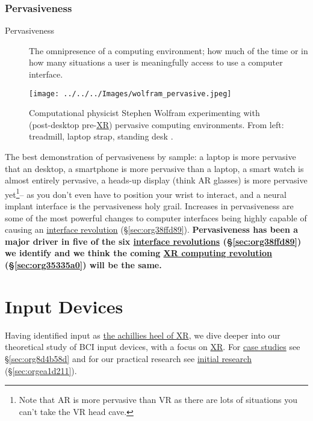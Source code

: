 \documentclass[logo,bsc,singlespacing,parskip]{infthesis}
\begin{document}
\subsection{Pervasiveness}
\label{sec:org7d4794a}
\medskip
\begin{mdframed}
\begin{description}
\item[{Pervasiveness\label{pervasiveness}}] The omnipresence of a computing environment; how much of the time or in how many situations a user is meaningfully access to use a computer interface.
\end{description}
\end{mdframed}

\begin{figure}[H]
\centering
\texttt{[image: ../../../Images/wolfram\_pervasive.jpeg]}
\caption[Stephen Wolfram experimenting with pervasive computing]{Computational physicist Stephen Wolfram experimenting with (post-desktop pre-\hyperref[org53dbe83]{XR}) pervasive computing environments. From left: treadmill, laptop strap, standing desk \autocite{SeekingProductiveLife}.}
\end{figure}

The best demonstration of pervasiveness by sample: a laptop is more pervasive that an desktop, a smartphone is more pervasive than a laptop, a smart watch is almost entirely pervasive, a heads-up display (think AR glasses) is more pervasive yet\footnote{Note that AR is more pervasive than VR as there are lots of situations you can't take the VR head cave.}-- as you don't even have to position your wrist to interact, and a neural implant interface is the pervasiveness holy grail.
Increases in pervasiveness are some of the most powerful changes to computer interfaces being highly capable of causing an \hyperref[sec:org38ffd89]{interface revolution} (\S \ref{sec:org38ffd89}).
\textbf{Pervasiveness has been a major driver in five of the six \hyperref[sec:org38ffd89]{interface revolutions} (\S \ref{sec:org38ffd89}) we identify and we think the coming \hyperref[sec:org35335a0]{XR computing revolution} (\S \ref{sec:org35335a0}) will be the same.}

\chapter{Input Devices}
\label{sec:org833010d}
Having identified input as \hyperref[sec:org5bf0840]{the achillies heel of XR}, we dive deeper into our theoretical study of BCI input devices, with a focus on \hyperref[org53dbe83]{XR}.
For \hyperref[sec:org8d4b58d]{case studies} see \S \ref{sec:org8d4b58d} and for our practical research see \hyperref[sec:orgea1d211]{initial research} (\S \ref{sec:orgea1d211}).
\end{document}
